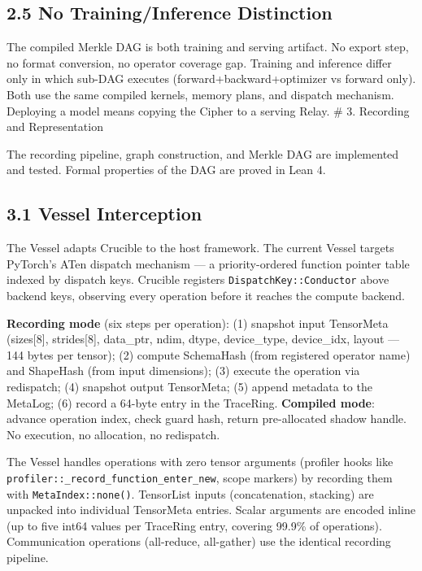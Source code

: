 \subsection{2.5 No Training/Inference Distinction}\label{no-traininginference-distinction}

The compiled Merkle DAG is both training and serving artifact. No export step, no format conversion, no operator coverage gap. Training and inference differ only in which sub-DAG executes (forward+backward+optimizer vs forward only). Both use the same compiled kernels, memory plans, and dispatch mechanism. Deploying a model means copying the Cipher to a serving Relay.
\# 3. Recording and Representation

The recording pipeline, graph construction, and Merkle DAG are implemented and tested. Formal properties of the DAG are proved in Lean 4.

\subsection{3.1 Vessel Interception}\label{vessel-interception}

The Vessel adapts Crucible to the host framework. The current Vessel targets PyTorch's ATen dispatch mechanism --- a priority-ordered function pointer table indexed by dispatch keys. Crucible registers \texttt{DispatchKey::Conductor} above backend keys, observing every operation before it reaches the compute backend.

\textbf{Recording mode} (six steps per operation): (1) snapshot input TensorMeta (sizes{[}8{]}, strides{[}8{]}, data\_ptr, ndim, dtype, device\_type, device\_idx, layout --- 144 bytes per tensor); (2) compute SchemaHash (from registered operator name) and ShapeHash (from input dimensions); (3) execute the operation via redispatch; (4) snapshot output TensorMeta; (5) append metadata to the MetaLog; (6) record a 64-byte entry in the TraceRing. \textbf{Compiled mode}: advance operation index, check guard hash, return pre-allocated shadow handle. No execution, no allocation, no redispatch.

The Vessel handles operations with zero tensor arguments (profiler hooks like \texttt{profiler::\_record\_function\_enter\_new}, scope markers) by recording them with \texttt{MetaIndex::none()}. TensorList inputs (concatenation, stacking) are unpacked into individual TensorMeta entries. Scalar arguments are encoded inline (up to five int64 values per TraceRing entry, covering 99.9\% of operations). Communication operations (all-reduce, all-gather) use the identical recording pipeline.

